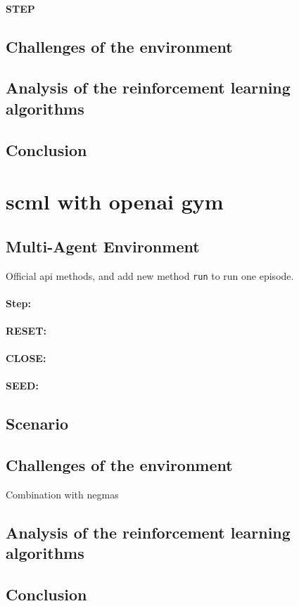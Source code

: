 \paragraph{STEP}

\subsection{Challenges of the environment}

\subsection{Analysis of the reinforcement learning algorithms}

\subsection{Conclusion}


\section{\gls{scml} with \gls{openai gym}}
\subsection{Multi-Agent Environment} \label{multi-agent-env}

Official api methods, and add new method \texttt{run} to run one episode.

\paragraph{Step:}
\paragraph{RESET:}
\paragraph{CLOSE:}
\paragraph{SEED:}

\subsection{Scenario} \label{scenario}

\subsection{Challenges of the environment}
Combination with \gls{negmas}

\subsection{Analysis of the reinforcement learning algorithms}

\subsection{Conclusion}
